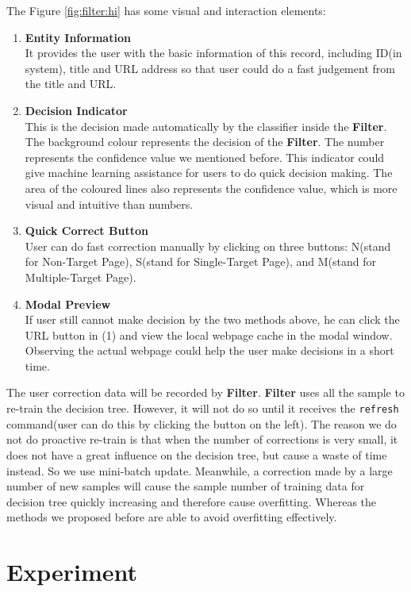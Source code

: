 The Figure \ref{fig:filter:hi} has some visual and interaction elements:
\begin{enumerate}
	\item \textbf{Entity Information}\\
	It provides the user with the basic information of this record, including ID(in system), title and URL address so that user could do a fast judgement from the title and URL.
	\item \textbf{Decision Indicator}\\
	This is the decision made automatically by the classifier inside the \textbf{Filter}. The background colour represents the decision of the \textbf{Filter}. The number represents the confidence value we mentioned before. This indicator could give machine learning assistance for users to do quick decision making. The area of the coloured lines also represents the confidence value, which is more visual and intuitive than numbers.
	\item \textbf{Quick Correct Button}\\
	User can do fast correction manually by clicking on three buttons: N(stand for Non-Target Page), S(stand for Single-Target Page), and M(stand for Multiple-Target Page).
	\item \textbf{Modal Preview}\\
	If user still cannot make decision by the two methods above, he can click the URL button in (1) and view the local webpage cache in the modal window. Observing the actual webpage could help the user make decisions in a short time.
\end{enumerate}

The user correction data will be recorded by \textbf{Filter}. \textbf{Filter} uses all the sample to re-train the decision tree. However, it will not do so until it receives the \texttt{refresh} command(user can do this by clicking the button on the left). The reason we do not do proactive re-train is that when the number of corrections is very small, it does not have a great influence on the decision tree, but cause a waste of time instead. So we use mini-batch update. Meanwhile, a correction made by a large number of new samples will cause the sample number of training data for decision tree quickly increasing and therefore cause overfitting. Whereas the methods we proposed before are able to avoid overfitting effectively.

\section{Experiment}

